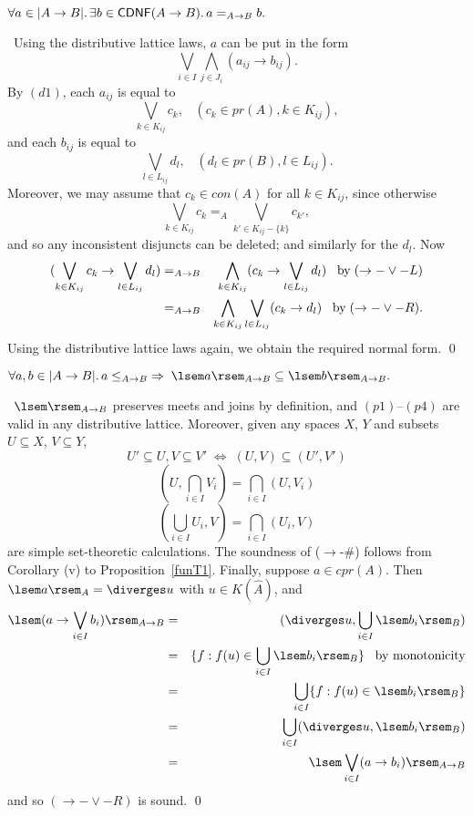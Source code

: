 \begin{proposition}[T2]
$\forall a \in |A \rightarrow B|. \, \exists b \in {\sf CDNF}(A \rightarrow B). \, a =_{A \rightarrow B} b.$ 
\end{proposition}

\proof\ Using the distributive lattice laws, $a$ can be put in the form
\[ \bigvee_{i \in I} \bigwedge_{j \in J_{i}} (a_{ij} \rightarrow b_{ij}). \]
By $(d1)$, each $a_{ij}$ is equal to
\[ \bigvee_{k \in K_{ij}}c_{k}, \;\;\; (c_{k} \in pr(A), k \in K_{ij}), \]
and each $b_{ij}$ is equal to 
\[ \bigvee_{l \in L_{ij}}d_{l}, \;\;\; (d_{l} \in pr(B), l \in L_{ij}). \]
Moreover, we may assume that $c_{k} \in con(A)$ for all $k \in K_{ij}$, since otherwise
\[ \bigvee_{k \in K_{ij}}c_{k} =_{A} \bigvee_{k' \in K_{ij} - \{k\}}c_{k'}, \]
and so any inconsistent disjuncts can be deleted; and similarly for the $d_{l}$. Now
\begin{eqnarray*}
(\bigvee_{k \in K_{ij}}c_{k} \rightarrow \bigvee_{l \in L_{ij}}d_{l}) & =_{A \rightarrow B} &
\bigwedge_{k \in K_{ij}}(c_{k} \rightarrow \bigvee_{l \in L_{ij}}d_{l}) \;\;\; {\rm by } \; (\rightarrow - \vee -L) \\
& =_{A \rightarrow B} & \bigwedge_{k \in K_{ij}} \bigvee_{l \in L_{ij}} (c_{k} \rightarrow d_{l}) \;\;\; {\rm by } \; (\rightarrow - \vee - R).
\end{eqnarray*}
Using the distributive lattice laws again, we obtain the required normal form. \qed
\begin{proposition}[T3]
$\forall a, b \in |A \rightarrow B|. \, a \leq_{A \rightarrow B} \; \Rightarrow \; \lsem a \rsem_{A \rightarrow B} \subseteq \lsem b \rsem_{A \rightarrow B}.$ 
\end{proposition}

\proof\ $\lsem \rsem_{A \rightarrow B}$ preserves meets and joins by definition, and $(p1)$--$(p4)$ are valid in any distributive lattice. Moreover, given any spaces $X$, $Y$ and subsets $U \subseteq X$, $V \subseteq Y$,
\[ U' \subseteq U, V \subseteq V' \; \Longleftrightarrow \; (U, V) \subseteq (U', V') \]
\[ (U, \bigcap_{i \in I}V_{i}) = \bigcap_{i \in I}(U, V_{i}) \]
\[ (\bigcup_{i \in I}U_{i}, V) = \bigcap_{i \in I}(U_{i}, V) \]
are simple set-theoretic calculations. The soundness of ($\rightarrow$-$\#$) 
follows from Corollary (v) to Proposition~\ref{funT1}. 
Finally, suppose $a \in cpr(A)$. 
Then $\lsem a \rsem_{A} = \diverges  u$ with $u \in K(\hat{A})$, and
\begin{eqnarray*}
\lsem (a \rightarrow \bigvee_{i \in I}b_{i}) \rsem_{A \rightarrow B} & = & (\diverges u, \bigcup_{i \in I}\lsem b_{i} \rsem_{B}) \\
& = & \{ f : f(u) \in \bigcup_{i \in I}\lsem b_{i} \rsem_{B} \} \;\;\; \mbox{by monotonicity}\\
& = & \bigcup_{i \in I}\{ f : f(u) \in \lsem b_{i} \rsem_{B} \} \\
& = & \bigcup_{i \in I}(\diverges u, \lsem b_{i} \rsem_{B}) \\
& = & \lsem \bigvee_{i \in I}(a \rightarrow b_{i}) \rsem_{A \rightarrow B}
\end{eqnarray*} 
and so $(\rightarrow - \vee - R)$ is sound. \qed

